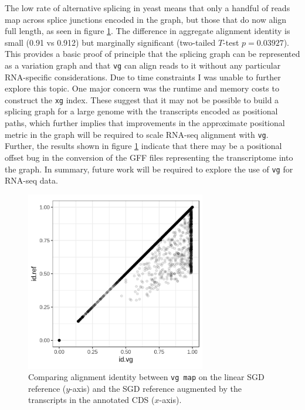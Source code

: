 The low rate of alternative splicing in yeast means that only a handful of reads map across splice junctions encoded in the graph, but those that do now align full length, as seen in figure \ref{fig:yeast_rnaseq}.
The difference in aggregate alignment identity is small (0.91 vs 0.912) but marginally significant (two-tailed $T$-test $p=0.03927$).
This provides a basic proof of principle that the splicing graph can be represented as a variation graph and that {\tt vg} can align reads to it without any particular RNA-specific considerations.
Due to time constraints I was unable to further explore this topic.
One major concern was the runtime and memory costs to construct the {\tt xg} index.
These suggest that it may not be possible to build a splicing graph for a large genome with the transcripts encoded as positional paths, which further implies that improvements in the approximate positional metric in the graph will be required to scale RNA-seq alignment with {\tt vg}.
Further, the results shown in figure \ref{fig:yeast_rnaseq} indicate that there may be a positional offset bug in the conversion of the GFF files representing the transcriptome into the graph.
In summary, future work will be required to explore the use of {\tt vg} for RNA-seq data.

\begin{figure}[htbp!]
  \centering
  \includegraphics[width=0.7\textwidth]{Chapter3/Figs/SRR2069949_100k_ref_vs_gene_model.png}
  \caption[Aligning reads against the yeast transcriptome]{
    Comparing alignment identity between {\tt vg map} on the linear SGD reference ($y$-axis) and the SGD reference augmented by the transcripts in the annotated CDS ($x$-axis).
  }
  \label{fig:yeast_rnaseq}
\end{figure}



